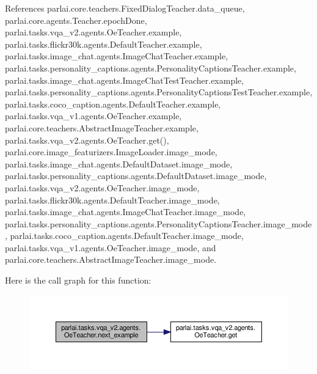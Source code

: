 References parlai.\+core.\+teachers.\+Fixed\+Dialog\+Teacher.\+data\+\_\+queue, parlai.\+core.\+agents.\+Teacher.\+epoch\+Done, parlai.\+tasks.\+vqa\+\_\+v2.\+agents.\+Oe\+Teacher.\+example, parlai.\+tasks.\+flickr30k.\+agents.\+Default\+Teacher.\+example, parlai.\+tasks.\+image\+\_\+chat.\+agents.\+Image\+Chat\+Teacher.\+example, parlai.\+tasks.\+personality\+\_\+captions.\+agents.\+Personality\+Captions\+Teacher.\+example, parlai.\+tasks.\+image\+\_\+chat.\+agents.\+Image\+Chat\+Test\+Teacher.\+example, parlai.\+tasks.\+personality\+\_\+captions.\+agents.\+Personality\+Captions\+Test\+Teacher.\+example, parlai.\+tasks.\+coco\+\_\+caption.\+agents.\+Default\+Teacher.\+example, parlai.\+tasks.\+vqa\+\_\+v1.\+agents.\+Oe\+Teacher.\+example, parlai.\+core.\+teachers.\+Abstract\+Image\+Teacher.\+example, parlai.\+tasks.\+vqa\+\_\+v2.\+agents.\+Oe\+Teacher.\+get(), parlai.\+core.\+image\+\_\+featurizers.\+Image\+Loader.\+image\+\_\+mode, parlai.\+tasks.\+image\+\_\+chat.\+agents.\+Default\+Dataset.\+image\+\_\+mode, parlai.\+tasks.\+personality\+\_\+captions.\+agents.\+Default\+Dataset.\+image\+\_\+mode, parlai.\+tasks.\+vqa\+\_\+v2.\+agents.\+Oe\+Teacher.\+image\+\_\+mode, parlai.\+tasks.\+flickr30k.\+agents.\+Default\+Teacher.\+image\+\_\+mode, parlai.\+tasks.\+image\+\_\+chat.\+agents.\+Image\+Chat\+Teacher.\+image\+\_\+mode, parlai.\+tasks.\+personality\+\_\+captions.\+agents.\+Personality\+Captions\+Teacher.\+image\+\_\+mode, parlai.\+tasks.\+coco\+\_\+caption.\+agents.\+Default\+Teacher.\+image\+\_\+mode, parlai.\+tasks.\+vqa\+\_\+v1.\+agents.\+Oe\+Teacher.\+image\+\_\+mode, and parlai.\+core.\+teachers.\+Abstract\+Image\+Teacher.\+image\+\_\+mode.

Here is the call graph for this function\+:
\nopagebreak
\begin{figure}[H]
\begin{center}
\leavevmode
\includegraphics[width=350pt]{classparlai_1_1tasks_1_1vqa__v2_1_1agents_1_1OeTeacher_aa1bd8754bec6bafbc67231d5fecb14b6_cgraph}
\end{center}
\end{figure}
\mbox{\label{classparlai_1_1tasks_1_1vqa__v2_1_1agents_1_1OeTeacher_a98b9f8bc131ddb23d185811a479dc742}} 
